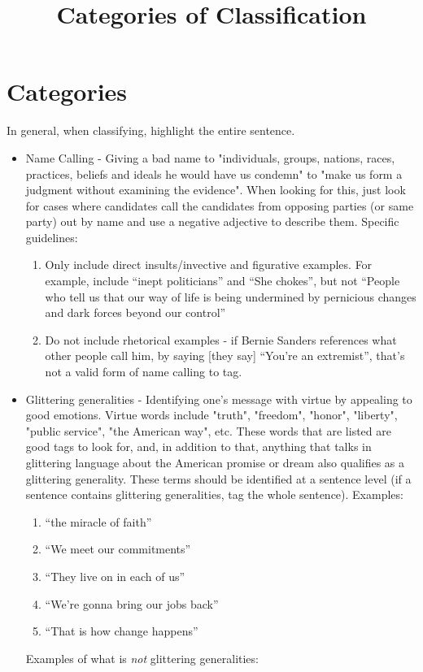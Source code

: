 \documentclass[letterpaper]{article}
\title{Categories of Classification}
\begin{document}
\section*{Categories}
In general, when classifying, highlight the entire sentence.
\begin{itemize}
	\item Name Calling - Giving a bad name to "individuals, groups, nations, races, practices, beliefs and ideals he would have us condemn" to "make us form a judgment without examining the evidence". When looking for this, just look for cases where candidates call the candidates from opposing parties (or same party) out by name and use a negative adjective to describe them. 
	Specific guidelines: \\
	\begin{enumerate}
		\item Only include direct insults/invective and figurative examples. For example, include ``inept politicians'' and ``She chokes'', but not ``People who tell us that our way of life is being undermined by pernicious changes and dark forces beyond our control''
		\item Do not include rhetorical examples - if Bernie Sanders references what other people call him, by saying [they say] ``You're an extremist'', that's not a valid form of name calling to tag.
	\end{enumerate}
	\item Glittering generalities - Identifying one's message with virtue by appealing to good emotions. Virtue words include "truth", "freedom", "honor", "liberty", "public service", "the American way", etc. These words that are listed are good tags to look for, and, in addition to that, anything that talks in glittering language about the American promise or dream also qualifies as a glittering generality. These terms should be identified at a sentence level (if a sentence contains glittering generalities, tag the whole sentence).
	Examples: \\
	\begin{enumerate}
		\item ``the miracle of faith'' 
		\item ``We meet our commitments''
		\item ``They live on in each of us''
		\item ``We're gonna bring our jobs back''
		\item ``That is how change happens''
	\end{enumerate}
	Examples of what is \emph{not} glittering generalities:

\end{itemize}
\end{document}
